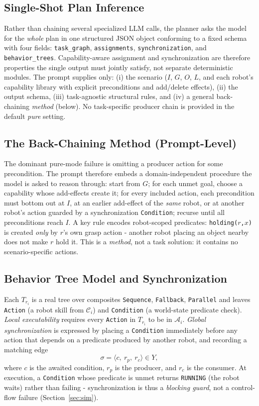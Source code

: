 \documentclass[journal]{IEEEtran}
\newcommand{\pred}[1]{\texttt{#1}}
\begin{document}
\subsection{Single-Shot Plan Inference}
Rather than chaining several specialized LLM calls, the planner asks the model for the \emph{whole} plan in one structured JSON object conforming to a fixed schema with four fields: \texttt{task\_graph}, \texttt{assignments}, \texttt{synchronization}, and \texttt{behavior\_trees}. Capability-aware assignment and synchronization are therefore properties the single output must jointly satisfy, not separate deterministic modules. The prompt supplies only: (i) the scenario ($I$, $G$, $O$, $L$, and each robot's capability library with explicit preconditions and add/delete effects), (ii) the output schema, (iii) task-agnostic structural rules, and (iv) a general back-chaining \emph{method} (below). No task-specific producer chain is provided in the default \emph{pure} setting.

\subsection{The Back-Chaining Method (Prompt-Level)}
The dominant pure-mode failure is omitting a producer action for some precondition. The prompt therefore embeds a domain-independent procedure the model is asked to reason through: start from $G$; for each unmet goal, choose a capability whose add-effects create it; for every included action, each precondition must bottom out at $I$, at an earlier add-effect of the \emph{same} robot, or at another robot's action guarded by a synchronization \pred{Condition}; recurse until all preconditions reach $I$. A key rule encodes robot-scoped predicates: \pred{holding($r$,$x$)} is created \emph{only} by $r$'s own grasp action - another robot placing an object nearby does not make $r$ hold it. This is a \emph{method}, not a task solution: it contains no scenario-specific actions.

\subsection{Behavior Tree Model and Synchronization}
Each $T_{r_i}$ is a real tree over composites \pred{Sequence}, \pred{Fallback}, \pred{Parallel} and leaves \pred{Action} (a robot skill from $\mathcal{C}_i$) and \pred{Condition} (a world-state predicate check). \emph{Local executability} requires every \pred{Action} in $T_{r_i}$ to be in $\mathcal{A}_i$. \emph{Global synchronization} is expressed by placing a \pred{Condition} immediately before any action that depends on a predicate produced by another robot, and recording a matching edge
\begin{equation}
    \sigma = \langle c,\ r_p,\ r_c \rangle \in Y,
\end{equation}
where $c$ is the awaited condition, $r_p$ is the producer, and $r_c$ is the consumer. At execution, a \pred{Condition} whose predicate is unmet returns \pred{RUNNING} (the robot waits) rather than failing - synchronization is thus a \emph{blocking guard}, not a control-flow failure (Section~\ref{sec:sim}).
\end{document}
